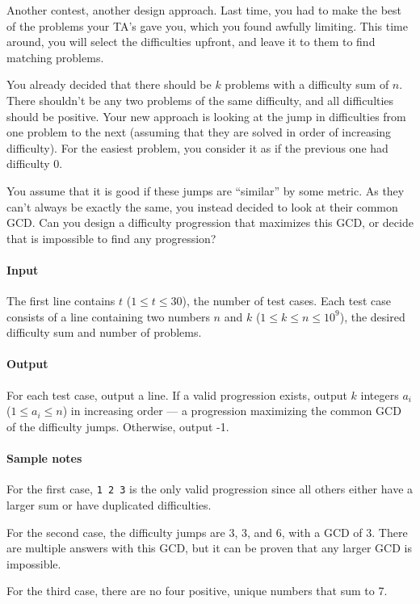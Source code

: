 

\usepackage{csquotes}



\makeheader

Another contest, another design approach.
Last time, you had to make the best of the problems your TA's gave you, which you found awfully limiting.
This time around, you will select the difficulties upfront, and leave it to them to find matching problems.

You already decided that there should be $k$ problems with a difficulty sum of $n$.
There shouldn't be any two problems of the same difficulty, and all difficulties should be positive.
Your new approach is looking at the jump in difficulties from one problem to the next (assuming that they are solved in order of increasing difficulty).
For the easiest problem, you consider it as if the previous one had difficulty 0.

You assume that it is good if these jumps are \enquote{similar} by some metric.
As they can't always be exactly the same, you instead decided to look at their common GCD.\@
Can you design a difficulty progression that maximizes this GCD, or decide that is impossible to find any progression?

\paragraph*{Input}

The first line contains $t$ ($1 \leq t \leq 30$), the number of test cases.
Each test case consists of a line containing two numbers $n$ and $k$ ($1 \leq k \leq n \leq 10^9$), the desired difficulty sum and number of problems.

\paragraph*{Output}

For each test case, output a line.
If a valid progression exists, output $k$ integers $a_i$ ($1 \leq a_i \leq n$) in increasing order --- a progression maximizing the common GCD of the difficulty jumps.
Otherwise, output -1.

\begin{samples}
\end{samples}

\paragraph*{Sample notes}

For the first case, \texttt{1 2 3} is the only valid progression since all others either have a larger sum or have duplicated difficulties.

For the second case, the difficulty jumps are $3$, $3$, and $6$, with a GCD of $3$.
There are multiple answers with this GCD, but it can be proven that any larger GCD is impossible.

For the third case, there are no four positive, unique numbers that sum to 7.


